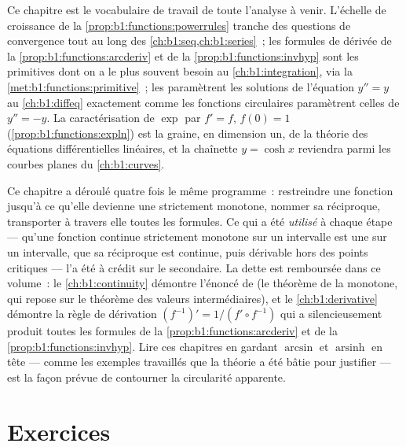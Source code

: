 \begin{remark}\label{rem:b1:functions:whereused}
Ce chapitre est le vocabulaire de travail de toute l'analyse à venir.
L'échelle de croissance de la \cref{prop:b1:functions:powerrules}
tranche des questions de convergence tout au long des
\cref{ch:b1:seq,ch:b1:series}~; les formules de dérivée de la
\cref{prop:b1:functions:arcderiv} et de la
\cref{prop:b1:functions:invhyp} sont les primitives dont on a le plus
souvent besoin au \cref{ch:b1:integration}, via la
\cref{met:b1:functions:primitive}~; les 
paramètrent les solutions de l'équation $y'' = y$ au
\cref{ch:b1:diffeq} exactement comme les fonctions circulaires
paramètrent celles de $y'' = -y$. La caractérisation de $\exp$ par
$f' = f$, $f(0) = 1$ (\cref{prop:b1:functions:expln}) est la graine,
en dimension un, de la théorie des équations différentielles
linéaires, et la chaînette $y = \cosh x$ reviendra parmi les courbes
planes du \cref{ch:b1:curves}.
\end{remark}

\begin{remark}\label{rem:b1:functions:interlude}
Ce chapitre a déroulé quatre fois le même programme~: restreindre une
fonction jusqu'à ce qu'elle devienne une  strictement
monotone, nommer sa réciproque, transporter à travers elle toutes les
formules. Ce qui a été \emph{utilisé} à chaque étape --- qu'une
fonction continue strictement monotone sur un intervalle est une
 sur un intervalle, que sa réciproque est continue, puis
dérivable hors des points critiques --- l'a été à crédit sur le
secondaire.
La dette est remboursée dans ce volume~: le \cref{ch:b1:continuity}
démontre l'énoncé de  (le théorème de la 
monotone, qui repose sur le théorème des valeurs intermédiaires), et
le \cref{ch:b1:derivative} démontre la règle de dérivation
$(f^{-1})' = 1/(f' \circ f^{-1})$ qui a silencieusement produit toutes
les formules de la \cref{prop:b1:functions:arcderiv} et de la
\cref{prop:b1:functions:invhyp}. Lire ces chapitres en gardant
$\arcsin$ et $\operatorname{arsinh}$ en tête --- comme les exemples
travaillés que la théorie a été bâtie pour justifier --- est la façon
prévue de contourner la circularité apparente.
\end{remark}

\section{Exercices}

